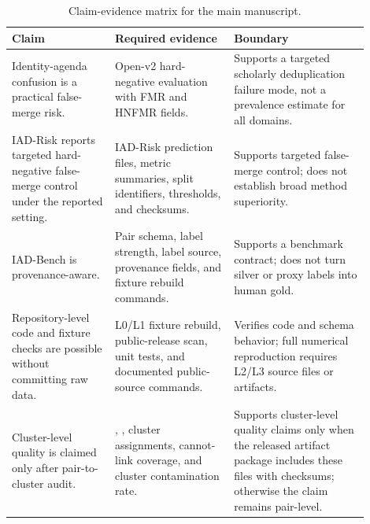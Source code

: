 \documentclass[11pt]{article}
\begin{document}
\begin{table}[h]
\caption{Claim-evidence matrix for the main manuscript.}
\label{tab:claim-evidence}
\centering
\small
\begin{tabular}{L{0.26\linewidth}L{0.30\linewidth}L{0.34\linewidth}}
\toprule
Claim & Required evidence & Boundary \\
\midrule
Identity-agenda confusion is a practical false-merge risk. & Open-v2 hard-negative evaluation with FMR and HNFMR fields. & Supports a targeted scholarly deduplication failure mode, not a prevalence estimate for all domains. \\
IAD-Risk reports targeted hard-negative false-merge control under the reported setting. & IAD-Risk prediction files, metric summaries, split identifiers, thresholds, and checksums. & Supports targeted false-merge control; does not establish broad method superiority. \\
IAD-Bench is provenance-aware. & Pair schema, label strength, label source, provenance fields, and fixture rebuild commands. & Supports a benchmark contract; does not turn silver or proxy labels into human gold. \\
Repository-level code and fixture checks are possible without committing raw data. & L0/L1 fixture rebuild, public-release scan, unit tests, and documented public-source commands. & Verifies code and schema behavior; full numerical reproduction requires L2/L3 source files or artifacts. \\
Cluster-level quality is claimed only after pair-to-cluster audit. & , , cluster assignments, cannot-link coverage, and cluster contamination rate. & Supports cluster-level quality claims only when the released artifact package includes these files with checksums; otherwise the claim remains pair-level. \\
\bottomrule
\end{tabular}
\end{table}
\end{document}
